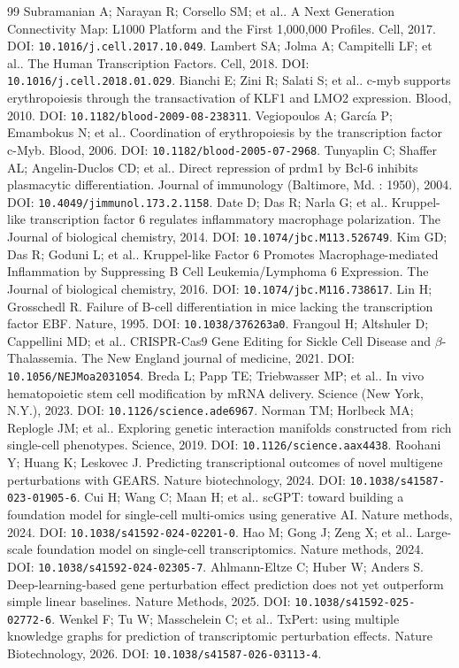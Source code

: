 \begin{thebibliography}{99}\small
{} Subramanian A;  Narayan R;  Corsello SM; et al.. A Next Generation Connectivity Map: L1000 Platform and the First 1,000,000 Profiles. Cell, 2017. DOI: \nolinkurl{10.1016/j.cell.2017.10.049}.
 Lambert SA;  Jolma A;  Campitelli LF; et al.. The Human Transcription Factors. Cell, 2018. DOI: \nolinkurl{10.1016/j.cell.2018.01.029}.
 Bianchi E;  Zini R;  Salati S; et al.. c-myb supports erythropoiesis through the transactivation of KLF1 and LMO2 expression. Blood, 2010. DOI: \nolinkurl{10.1182/blood-2009-08-238311}.
 Vegiopoulos A;  García P;  Emambokus N; et al.. Coordination of erythropoiesis by the transcription factor c-Myb. Blood, 2006. DOI: \nolinkurl{10.1182/blood-2005-07-2968}.
 Tunyaplin C;  Shaffer AL;  Angelin-Duclos CD; et al.. Direct repression of prdm1 by Bcl-6 inhibits plasmacytic differentiation. Journal of immunology (Baltimore, Md. : 1950), 2004. DOI: \nolinkurl{10.4049/jimmunol.173.2.1158}.
 Date D;  Das R;  Narla G; et al.. Kruppel-like transcription factor 6 regulates inflammatory macrophage polarization. The Journal of biological chemistry, 2014. DOI: \nolinkurl{10.1074/jbc.M113.526749}.
 Kim GD;  Das R;  Goduni L; et al.. Kruppel-like Factor 6 Promotes Macrophage-mediated Inflammation by Suppressing B Cell Leukemia/Lymphoma 6 Expression. The Journal of biological chemistry, 2016. DOI: \nolinkurl{10.1074/jbc.M116.738617}.
 Lin H;  Grosschedl R. Failure of B-cell differentiation in mice lacking the transcription factor EBF. Nature, 1995. DOI: \nolinkurl{10.1038/376263a0}.
 Frangoul H;  Altshuler D;  Cappellini MD; et al.. CRISPR-Cas9 Gene Editing for Sickle Cell Disease and $\beta$-Thalassemia. The New England journal of medicine, 2021. DOI: \nolinkurl{10.1056/NEJMoa2031054}.
 Breda L;  Papp TE;  Triebwasser MP; et al.. In vivo hematopoietic stem cell modification by mRNA delivery. Science (New York, N.Y.), 2023. DOI: \nolinkurl{10.1126/science.ade6967}.
 Norman TM;  Horlbeck MA;  Replogle JM; et al.. Exploring genetic interaction manifolds constructed from rich single-cell phenotypes. Science, 2019. DOI: \nolinkurl{10.1126/science.aax4438}.
 Roohani Y;  Huang K;  Leskovec J. Predicting transcriptional outcomes of novel multigene perturbations with GEARS. Nature biotechnology, 2024. DOI: \nolinkurl{10.1038/s41587-023-01905-6}.
 Cui H;  Wang C;  Maan H; et al.. scGPT: toward building a foundation model for single-cell multi-omics using generative AI. Nature methods, 2024. DOI: \nolinkurl{10.1038/s41592-024-02201-0}.
 Hao M;  Gong J;  Zeng X; et al.. Large-scale foundation model on single-cell transcriptomics. Nature methods, 2024. DOI: \nolinkurl{10.1038/s41592-024-02305-7}.
 Ahlmann-Eltze C;  Huber W;  Anders S. Deep-learning-based gene perturbation effect prediction does not yet outperform simple linear baselines. Nature Methods, 2025. DOI: \nolinkurl{10.1038/s41592-025-02772-6}.
 Wenkel F;  Tu W;  Masschelein C; et al.. TxPert: using multiple knowledge graphs for prediction of transcriptomic perturbation effects. Nature Biotechnology, 2026. DOI: \nolinkurl{10.1038/s41587-026-03113-4}.
\end{thebibliography}